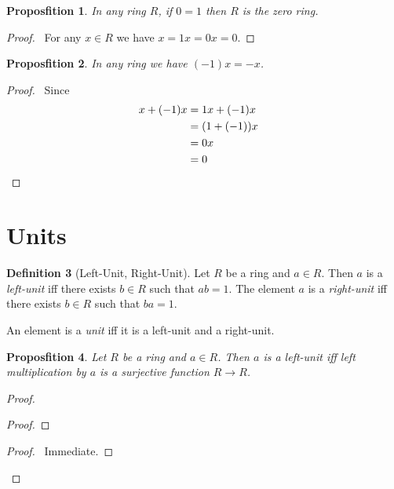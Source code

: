 \documentclass{book}
\let\qed\relax
\newtheorem{prop}{Proposfition}[chapter]
\theoremstyle{definition}
\newtheorem{df}[prop]{Definition}
\begin{document}
\begin{prop}
In any ring $R$, if $0 = 1$ then $R$ is the zero ring.
\end{prop}

\begin{proof}
\pf\ For any $x \in R$ we have $x = 1x = 0x = 0$. \qed
\end{proof}

\begin{prop}
In any ring we have $(-1)x = -x$.
\end{prop}

\begin{proof}
\pf\ Since
\begin{align*}
x + (-1)x & = 1x + (-1) x \\
& = (1 + (-1))x \\
& = 0x \\
& = 0 & \qed
\end{align*}
\end{proof}

\section{Units}

\begin{df}[Left-Unit, Right-Unit]
Let $R$ be a ring and $a \in R$. Then $a$ is a \emph{left-unit} iff there exists $b \in R$ such that $ab = 1$. The element $a$ is a \emph{right-unit} iff there exists $b \in R$ such that $ba = 1$.

An element is a \emph{unit} iff it is a left-unit and a right-unit.
\end{df}

\begin{prop}
Let $R$ be a ring and $a \in R$. Then $a$ is a left-unit iff left multiplication by $a$ is a surjective function $R \rightarrow R$.
\end{prop}

\begin{proof}
\pf
{}
\begin{proof}
\end{proof}
\begin{proof}
	\pf\ Immediate.
\end{proof}
\qed
\end{proof}
\end{document}
